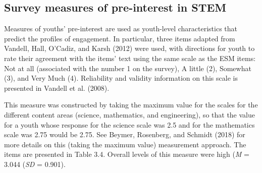 \documentclass[]{msu-thesis}
\theoremstyle{definition}
\theoremstyle{definition}
\theoremstyle{definition}
\theoremstyle{remark}
\begin{document}
\begin{landscape}\begin{table}

\caption{\label{tab:unnamed-chunk-5}Coding Frame for the Aspects of Work with Data}
\centering
{}
\end{table}
\end{landscape}

\subsection{Survey measures of pre-interest in
STEM}\label{survey-measures-of-pre-interest-in-stem}

Measures of youths' pre-interest are used as youth-level characteristics
that predict the profiles of engagement. In particular, three items
adapted from Vandell, Hall, O'Cadiz, and Karsh (2012) were used, with
directions for youth to rate their agreement with the items' text using
the same scale as the ESM items: Not at all (associated with the number
1 on the survey), A little (2), Somewhat (3), and Very Much (4).
Reliability and validity information on this scale is presented in
Vandell et al. (2008).

This measure was constructed by taking the maximum value for the scales
for the different content areas (science, mathematics, and engineering),
so that the value for a youth whose response for the science scale was
2.5 and for the mathematics scale was 2.75 would be 2.75. See Beymer,
Rosenberg, and Schmidt (2018) for more details on this (taking the
maximum value) measurement approach. The items are presented in Table
3.4. Overall levels of this measure were high (\emph{M} = 3.044
(\emph{SD} = 0.901).
\end{document}
